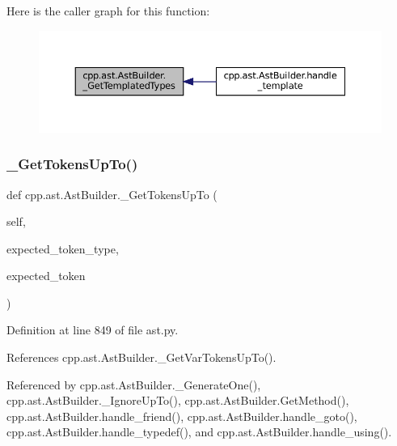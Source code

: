 Here is the caller graph for this function\+:
\nopagebreak
\begin{figure}[H]
\begin{center}
\leavevmode
\includegraphics[width=350pt]{classcpp_1_1ast_1_1AstBuilder_a07d463f974a3a33de2840fc6965906c3_icgraph}
\end{center}
\end{figure}
\mbox{\label{classcpp_1_1ast_1_1AstBuilder_a93e70a799351e5c40f07efb218889b31}} 
\subsubsection{\texorpdfstring{\+\_\+\+Get\+Tokens\+Up\+To()}{\_GetTokensUpTo()}}
{\footnotesize\ttfamily def cpp.\+ast.\+Ast\+Builder.\+\_\+\+Get\+Tokens\+Up\+To (\begin{DoxyParamCaption}\item[{}]{self,  }\item[{}]{expected\+\_\+token\+\_\+type,  }\item[{}]{expected\+\_\+token }\end{DoxyParamCaption})\hspace{0.3cm}{\ttfamily [private]}}



Definition at line 849 of file ast.\+py.



References cpp.\+ast.\+Ast\+Builder.\+\_\+\+Get\+Var\+Tokens\+Up\+To().



Referenced by cpp.\+ast.\+Ast\+Builder.\+\_\+\+Generate\+One(), cpp.\+ast.\+Ast\+Builder.\+\_\+\+Ignore\+Up\+To(), cpp.\+ast.\+Ast\+Builder.\+Get\+Method(), cpp.\+ast.\+Ast\+Builder.\+handle\+\_\+friend(), cpp.\+ast.\+Ast\+Builder.\+handle\+\_\+goto(), cpp.\+ast.\+Ast\+Builder.\+handle\+\_\+typedef(), and cpp.\+ast.\+Ast\+Builder.\+handle\+\_\+using().


